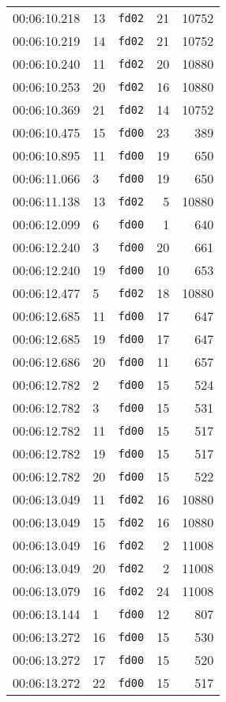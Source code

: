 \documentclass{article}
\begin{document}
\begin{longtable}{lllrr}
00:06:10.218 & 13 & \texttt{fd02} & 21 & 10752 \\
00:06:10.219 & 14 & \texttt{fd02} & 21 & 10752 \\
00:06:10.240 & 11 & \texttt{fd02} & 20 & 10880 \\
00:06:10.253 & 20 & \texttt{fd02} & 16 & 10880 \\
00:06:10.369 & 21 & \texttt{fd02} & 14 & 10752 \\
00:06:10.475 & 15 & \texttt{fd00} & 23 & 389 \\
00:06:10.895 & 11 & \texttt{fd00} & 19 & 650 \\
00:06:11.066 & 3 & \texttt{fd00} & 19 & 650 \\
00:06:11.138 & 13 & \texttt{fd02} & 5 & 10880 \\
00:06:12.099 & 6 & \texttt{fd00} & 1 & 640 \\
00:06:12.240 & 3 & \texttt{fd00} & 20 & 661 \\
00:06:12.240 & 19 & \texttt{fd00} & 10 & 653 \\
00:06:12.477 & 5 & \texttt{fd02} & 18 & 10880 \\
00:06:12.685 & 11 & \texttt{fd00} & 17 & 647 \\
00:06:12.685 & 19 & \texttt{fd00} & 17 & 647 \\
00:06:12.686 & 20 & \texttt{fd00} & 11 & 657 \\
00:06:12.782 & 2 & \texttt{fd00} & 15 & 524 \\
00:06:12.782 & 3 & \texttt{fd00} & 15 & 531 \\
00:06:12.782 & 11 & \texttt{fd00} & 15 & 517 \\
00:06:12.782 & 19 & \texttt{fd00} & 15 & 517 \\
00:06:12.782 & 20 & \texttt{fd00} & 15 & 522 \\
00:06:13.049 & 11 & \texttt{fd02} & 16 & 10880 \\
00:06:13.049 & 15 & \texttt{fd02} & 16 & 10880 \\
00:06:13.049 & 16 & \texttt{fd02} & 2 & 11008 \\
00:06:13.049 & 20 & \texttt{fd02} & 2 & 11008 \\
00:06:13.079 & 16 & \texttt{fd02} & 24 & 11008 \\
00:06:13.144 & 1 & \texttt{fd00} & 12 & 807 \\
00:06:13.272 & 16 & \texttt{fd00} & 15 & 530 \\
00:06:13.272 & 17 & \texttt{fd00} & 15 & 520 \\
00:06:13.272 & 22 & \texttt{fd00} & 15 & 517 \\

\end{longtable}
\end{document}
